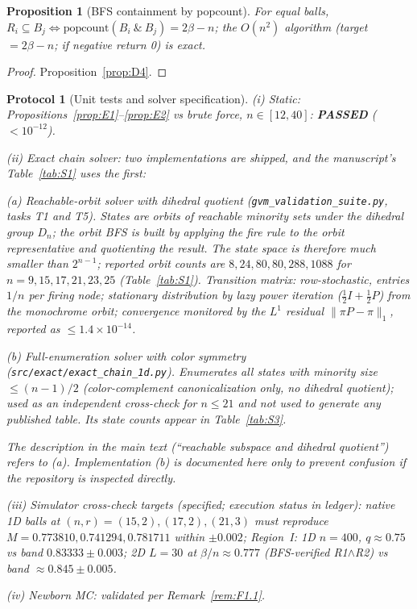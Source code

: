\documentclass[preprint,12pt]{elsarticle}
\newtheorem{proposition}[theorem]{Proposition}
\newtheorem{protocol}[theorem]{Protocol}
\begin{document}
\begin{proposition}[BFS containment by popcount]
\label{prop:F2}
For equal balls,
$R_i\subseteq B_j\iff\mathrm{popcount}(B_i\ \&\ B_j)=2\beta-n$; the
$O(n^2)$ algorithm (target $=2\beta-n$; if negative return 0) is exact.
\end{proposition}
\begin{proof}
Proposition~\ref{prop:D4}.
\end{proof}

\begin{protocol}[Unit tests and solver specification]
\label{prot:F3}
(i) \emph{Static:} Propositions~\ref{prop:E1}--\ref{prop:E2} vs brute
force, $n\in[12,40]$: \textbf{PASSED} ($<10^{-12}$).

(ii) \emph{Exact chain solver:} two implementations are shipped, and the
manuscript's Table~\ref{tab:S1} uses the first:

(a) \emph{Reachable-orbit solver with dihedral quotient}
(\texttt{gvm\_validation\_suite.py}, tasks T1 and T5). States are orbits
of reachable minority sets under the dihedral group $D_n$; the orbit
BFS is built by applying the fire rule to the orbit representative and
quotienting the result. The state space is therefore much smaller than
$2^{n-1}$; reported orbit counts are $8, 24, 80, 80, 288, 1088$ for
$n=9,15,17,21,23,25$ (Table~\ref{tab:S1}). Transition matrix:
row-stochastic, entries $1/n$ per firing node; stationary distribution
by lazy power iteration ($\tfrac12 I+\tfrac12 P$) from the monochrome
orbit; convergence monitored by the $L^1$ residual
$\|\pi P-\pi\|_1$, reported as $\le1.4\times10^{-14}$.

(b) \emph{Full-enumeration solver with color symmetry}
(\texttt{src/exact/exact\_chain\_1d.py}). Enumerates all states with
minority size $\le(n-1)/2$ (color-complement canonicalization only, no
dihedral quotient); used as an independent cross-check for
$n\le21$ and not used to generate any published table. Its state counts
appear in Table~\ref{tab:S3}.

The description in the main text (``reachable subspace and dihedral
quotient'') refers to (a). Implementation (b) is documented here only
to prevent confusion if the repository is inspected directly.

(iii) \emph{Simulator cross-check targets (specified; execution status
in ledger):} native 1D balls at $(n,r)=(15,2),(17,2),(21,3)$ must
reproduce $M=0.773810,0.741294,0.781711$ within $\pm0.002$; Region~I:
1D $n=400$, $q\approx0.75$ vs band $0.83333\pm0.003$; 2D $L=30$ at
$\beta/n\approx0.777$ (BFS-verified R1$\wedge$R2) vs band
$\approx0.845\pm0.005$.

(iv) \emph{Newborn MC:} validated per Remark~\ref{rem:F1.1}.
\end{protocol}
\end{document}
